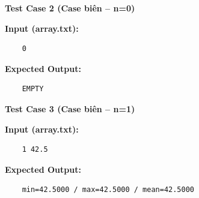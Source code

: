     \textbf{Test Case 2 (Case biên -- n=0)}

    \textbf{Input (array.txt):}
    \begin{lstlisting}
    0\end{lstlisting}

    \textbf{Expected Output:}
    \begin{lstlisting}
    EMPTY\end{lstlisting}
    \textbf{Test Case 3 (Case biên -- n=1)}

    \textbf{Input (array.txt):}
    \begin{lstlisting}
    1 42.5\end{lstlisting}

    \textbf{Expected Output:}
    \begin{lstlisting}
    min=42.5000 / max=42.5000 / mean=42.5000\end{lstlisting}